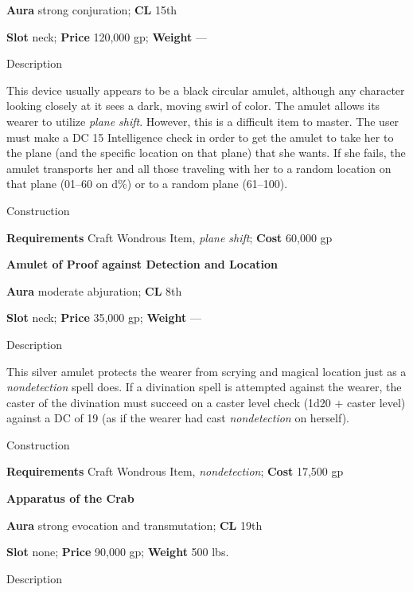 \textbf{Aura} strong conjuration;\textbf{ CL }15th
				
\textbf{Slot} neck; \textbf{Price} 120,000 gp; \textbf{Weight} ---
				
Description
				
This device usually appears to be a black circular amulet, although any character looking closely at it sees a dark, moving swirl of color. The amulet allows its wearer to utilize \textit{plane shift}. However, this is a difficult item to master. The user must make a DC 15 Intelligence check in order to get the amulet to take her to the plane (and the specific location on that plane) that she wants. If she fails, the amulet transports her and all those traveling with her to a random location on that plane (01--60 on d\%) or to a random plane (61--100). 
				
Construction
				
\textbf{Requirements} Craft Wondrous Item, \textit{plane shift}; \textbf{Cost }60,000 gp
				
\textbf{Amulet of Proof against Detection and Location}
				
\textbf{Aura} moderate abjuration;\textbf{ CL }8th
				
\textbf{Slot} neck; \textbf{Price} 35,000 gp; \textbf{Weight} ---
				
Description
				
This silver amulet protects the wearer from scrying and magical location just as a \textit{nondetection }spell does. If a divination spell is attempted against the wearer, the caster of the divination must succeed on a caster level check (1d20 + caster level) against a DC of 19 (as if the wearer had cast \textit{nondetection }on herself). 
				
Construction
				
\textbf{Requirements} Craft Wondrous Item, \textit{nondetection}; \textbf{Cost }17,500 gp
				
\textbf{Apparatus of the Crab}
				
\textbf{Aura} strong evocation and transmutation; \textbf{CL} 19th
				
\textbf{Slot} none; \textbf{Price} 90,000 gp; \textbf{Weight} 500 lbs.
				
Description
				
